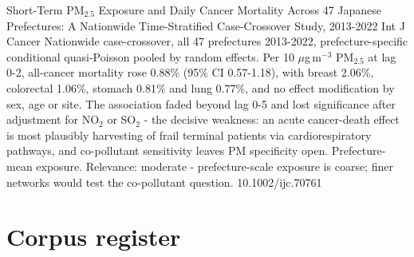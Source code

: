 \documentclass[10pt]{article}
\begin{document}
\par{}\baselineskip{}\baselineskip
{}

{Short-Term PM$_{2.5}$ Exposure and Daily Cancer Mortality Across 47 Japanese Prefectures: A Nationwide Time-Stratified Case-Crossover Study, 2013-2022}
{Int J Cancer}
{Nationwide case-crossover, all 47 prefectures 2013-2022, prefecture-specific conditional quasi-Poisson pooled by random effects. Per 10 $\mu$g\,m$^{-3}$ PM$_{2.5}$ at lag 0-2, all-cancer mortality rose 0.88\% (95\% CI 0.57-1.18), with breast 2.06\%, colorectal 1.06\%, stomach 0.81\% and lung 0.77\%, and no effect modification by sex, age or site. The association faded beyond lag 0-5 and lost significance after adjustment for NO$_2$ or SO$_2$ - the decisive weakness: an acute cancer-death effect is most plausibly harvesting of frail terminal patients via cardiorespiratory pathways, and co-pollutant sensitivity leaves PM specificity open. Prefecture-mean exposure. Relevance: moderate - prefecture-scale exposure is coarse; finer networks would test the co-pollutant question.}
{10.1002/ijc.70761}

\clearpage
\section*{\sffamily\bfseries\color{Deep}Corpus register}
\vspace{-1.5mm}{\color{Amber}\rule{\linewidth}{1.1pt}}\vspace{2.5mm}



\vspace{2mm}
\end{document}
